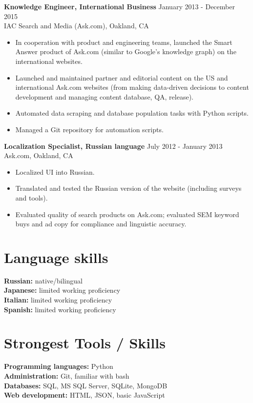 \documentclass[10pt,line,letterpaper]{res}
\begin{document}
\begin{resume}
    {\bf Knowledge Engineer, International Business} \hfill January 2013 - December 2015 \\
    IAC Search and Media (Ask.com), Oakland, CA
    \begin{itemize} \itemsep -2pt
    \item In cooperation with product and engineering teams, launched the Smart Answer product of Ask.com (similar to Google's knowledge graph) on the international websites.
    \item Launched and maintained partner and editorial content on the US and international Ask.com websites (from making data-driven decisions to content development and managing content database, QA, release).
    \item Automated data scraping and database population tasks with Python scripts.
    \item Managed a Git repository for automation scripts.
    \end{itemize}

    {\bf Localization Specialist, Russian language} \hfill July 2012 - January 2013 \\
    Ask.com, Oakland, CA
    \begin{itemize} \itemsep -2pt
    \item Localized UI into Russian.
    \item Translated and tested the Russian version of the website (including surveys and tools).
    \item Evaluated quality of search products on Ask.com; evaluated SEM keyword buys and ad copy for compliance and linguistic accuracy.

    \end{itemize}

\section {Language skills}
    {\bf Russian:} native/bilingual \\
	{\bf Japanese:} limited working proficiency \\
    {\bf Italian:} limited working proficiency \\
    {\bf Spanish:} limited working proficiency \\

\section{Strongest Tools / Skills}
    {\bf Programming languages:} Python \\
    {\bf Administration:} Git, familiar with bash \\
    {\bf Databases:}  SQL, MS SQL Server, SQLite, MongoDB\\
    {\bf Web development:} HTML, JSON, basic JavaScript \\


\end{resume}
\end{document}
